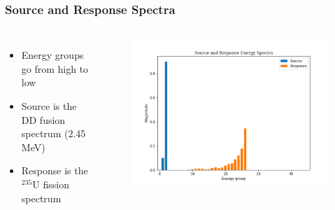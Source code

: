 \documentclass[t]{beamer}
\newcommand{\tildecenter}{\raisebox{0.5ex}{\texttildelow}}
\begin{document}
\begin{frame}
  \frametitle{Source and Response Spectra}
  \begin{columns}[c]
    \begin{itemize}
      \item Energy groups go from high to low
      \item Source is the DD fusion spectrum (\tildecenter 2.45 MeV)
      \item Response is the ${}^{\text{235}}\text{U}$ fission spectrum
    \end{itemize}
    \begin{figure}
      \includegraphics[trim={0.4in 0.2in 0.75in 0.4in},clip,scale=0.45]{images/spectra_lin.png}
    \end{figure}
  \end{columns}
\end{frame}
\end{document}
